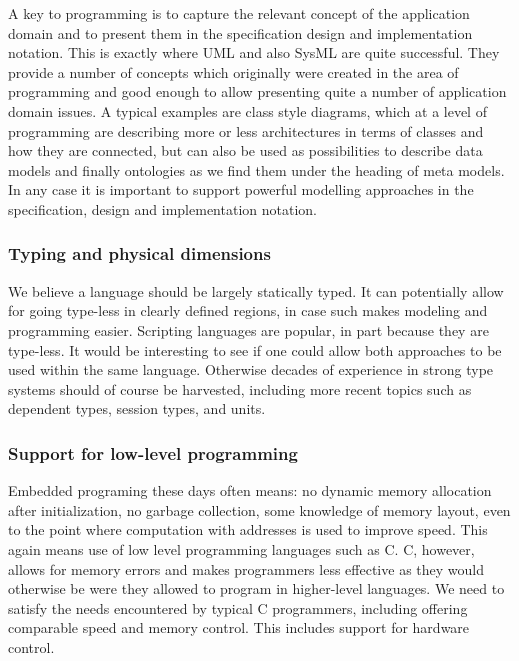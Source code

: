 A key to programming is to capture the relevant concept of the 
application domain and to present them in the specification design 
and implementation notation. This is exactly where UML and also 
SysML are quite successful. They provide a number of concepts which 
originally were created in the area of programming and good enough 
to allow presenting quite a number of application domain issues. A 
typical examples are class style diagrams, which at a level of 
programming are describing more or less architectures in terms of 
classes and how they are connected, but can also be used as 
possibilities to describe data models and finally ontologies as we 
find them under the heading of meta models. In any case it is 
important to support powerful modelling approaches in the 
specification, design and implementation notation.


\subsubsection{Typing and physical dimensions}

We believe a language should be largely statically typed. It can 
potentially allow for going type-less in clearly defined regions, 
in case such makes modeling and programming easier. Scripting 
languages are popular, in part because they are type-less. It would 
be interesting to see if one could allow both approaches to be used 
within the same language. Otherwise decades of experience in strong 
type systems should of course be harvested, including more recent 
topics such as dependent types, session types, and units.


\subsubsection{Support for low-level programming}

Embedded programing these days often means: no dynamic memory 
allocation after initialization, no garbage collection, some 
knowledge of memory layout, even to the point where computation 
with addresses is used to improve speed. This again means use of 
low level programming languages such as C. C, however, allows for 
memory errors and makes programmers less effective as they would 
otherwise be were they allowed to program in higher-level 
languages. We need to satisfy the needs encountered by typical C 
programmers, including offering comparable speed and memory 
control. This includes support for hardware control.


